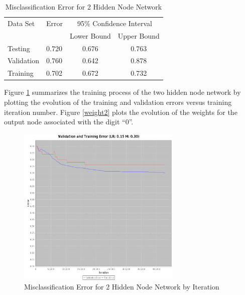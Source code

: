 \documentclass{article}
\begin{document}
\begin{table}
\caption{Misclassification Error for 2 Hidden Node Network}
\begin{center}
\begin{tabular}{llcc}
\toprule
Data Set & Error & \multicolumn{2}{c}{95\% Confidence Interval} \\
\cmidrule(r){3-4}
& & Lower Bound & Upper Bound \\
\midrule
Testing       & 0.720 &  0.676 & 0.763  \\
Validation    & 0.760 &  0.642 & 0.878  \\
Training      & 0.702 &  0.672 & 0.732  \\
\bottomrule
\end{tabular}
\label{table2}
\end{center}
\end{table}

Figure \ref{error2} summarizes the training process of the two hidden node network by plotting the evolution of the training and validation errors versus training iteration number. Figure \ref{weight2} plots the evolution of the weights for the output node associated with the digit ``0''.

\begin{figure}
\centering
\includegraphics[width=0.7\textwidth]{data/final/2_hidden_node_error.png}
\caption{Misclassification Error for 2 Hidden Node Network by Iteration}
\label{error2}
\end{figure}
\end{document}
